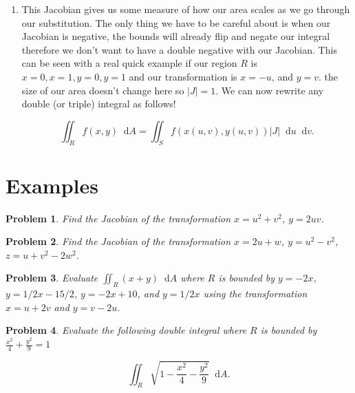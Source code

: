 \documentclass[11pt]{article}
\newtheorem{problem}{Problem}
\newcommand*\dif{\mathop{}\!\mathrm{d}}
\begin{document}
\begin{enumerate}
\item This Jacobian gives us some measure of how our area scales as we go through our substitution. The only thing we have to be careful about is when our Jacobian is negative, the bounds will already flip and negate our integral therefore we don't want to have a double negative with our Jacobian. This can be seen with a real quick example if our region $R$ is $x=0,x=1,y=0,y=1$ and our transformation is $x=-u$, and $y=v$. the size of our area doesn't change here so $|J| = 1$. We can now rewrite any double (or triple) integral as follows!

\begin{equation*}
    \iint_R f(x,y) \dif{A}  = \iint_S f(x(u,v),y(u,v)) |J| \dif{u}\dif{v}.
\end{equation*}




\end{enumerate}




\section{Examples}

\begin{problem}
    Find the Jacobian of the transformation $x = u^2+v^2$, $y = 2uv$.
\end{problem}

\vspace{4cm}

\begin{problem}
    Find the Jacobian of the transformation $x = 2u+w$, $y= u^2-v^2$, $z = u+v^2-2w^2$.
\end{problem}


\newpage


\begin{problem}
    Evaluate $\iint_R (x+y) \dif{A}$ where $R$ is bounded by $y = -2x$, $y= 1/2x - 15/2$, $y = -2x+10$, and $y = 1/2 x$ using the transformation $x = u+2v$ and $y = v-2u$.
\end{problem}


\vspace{9cm}

\begin{problem}
    Evaluate the following  double integral where $R$ is bounded by $\frac{x^2}{4}+\frac{y^2}{9}=1$

    \begin{equation*}
        \iint_R \sqrt{1 - \frac{x^2}{4}-\frac{y^2}{9}} \dif{A}.
    \end{equation*}
\end{problem}
\end{document}
